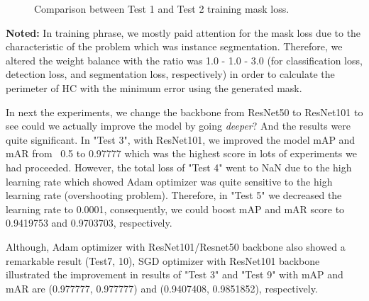 	\begin{figure}[H]
		\centering
		\hfill %
		\hfill %
		\caption{Comparison between Test 1 and Test 2 training mask loss.}
		\label{fig:mask_loss_12}
	\end{figure}

\noindent	
	\textbf{Noted:} In training phrase, we mostly paid attention for the mask loss due to the characteristic of the problem which was instance segmentation. Therefore, we altered the weight balance with the ratio was 1.0 - 1.0 - 3.0 (for classification loss, detection loss, and segmentation loss, respectively) in order to calculate the perimeter of HC with the minimum error using the generated mask.
	
 	In next the experiments, we change the backbone from ResNet50 to ResNet101 to see could we actually improve the model by going \textit{deeper}? And the results were quite significant. In "Test 3", with ResNet101, we improved the model mAP and mAR from ~0.5 to 0.97777 which was the highest score in lots of experiments we had proceeded. However, the total loss of "Test 4" went to NaN due to the high learning rate which showed Adam optimizer was quite sensitive to the high learning rate (overshooting problem). Therefore, in "Test 5" we decreased the learning rate to 0.0001, consequently, we could boost mAP and mAR score to 0.9419753 and 0.9703703, respectively.
	
	Although, Adam optimizer with ResNet101/Resnet50 backbone also showed a remarkable result (Test7, 10), SGD optimizer with ResNet101 backbone illustrated the improvement in results of "Test 3" and "Test 9" with mAP and mAR are (0.977777, 0.977777) and (0.9407408, 0.9851852), respectively.
	
